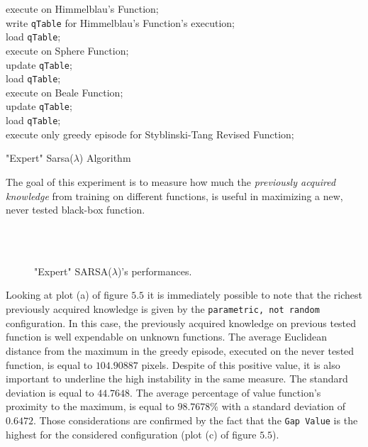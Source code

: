 \begin{algorithm} [h!]

 {
	{execute on Himmelblau's Function; \\
		write {\tt qTable} for Himmelblau's Function's execution; \\
		load {\tt qTable}; \\
		execute on Sphere Function; \\
		update {\tt qTable}; \\
		load {\tt qTable}; \\
		execute on Beale Function; \\
		update {\tt qTable}; \\
		load {\tt qTable}; \\
		execute only greedy episode for Styblinski-Tang Revised Function;
	} 
}
	\caption{"Expert" Sarsa($\lambda$) Algorithm} 
	\label{ExpertAlgo}
\end{algorithm}
 
The goal of this experiment is to measure how much the \textit{previously acquired knowledge} from training on different functions, is useful in maximizing a new, never tested black-box function.

\begin{figure}[h!]
	\begin{center}
		\\
		 \\
		
	\end{center}
	\caption{
		"Expert" SARSA($\lambda$)'s  performances.
	}
	\label{fig:ExpertResults}
\end{figure}

Looking at plot (a) of figure $5.5$ it is immediately possible to note that the richest previously acquired knowledge is given by the {\tt parametric, not random} configuration. In this case, the previously acquired knowledge on previous tested function is well expendable on unknown functions. The average Euclidean distance from the maximum in the greedy episode, executed on the never tested function, is equal to $104.90887$ pixels. Despite of this positive value, it is also important to underline the high instability in the same measure. The standard deviation is equal to $44.7648$. The average percentage of value function's proximity to the maximum, is  equal to $98.7678\%$ with a standard deviation of $0.6472$. Those considerations are confirmed by the fact that the {\tt Gap Value} is the highest for the considered configuration (plot (c) of figure $5.5$). 

